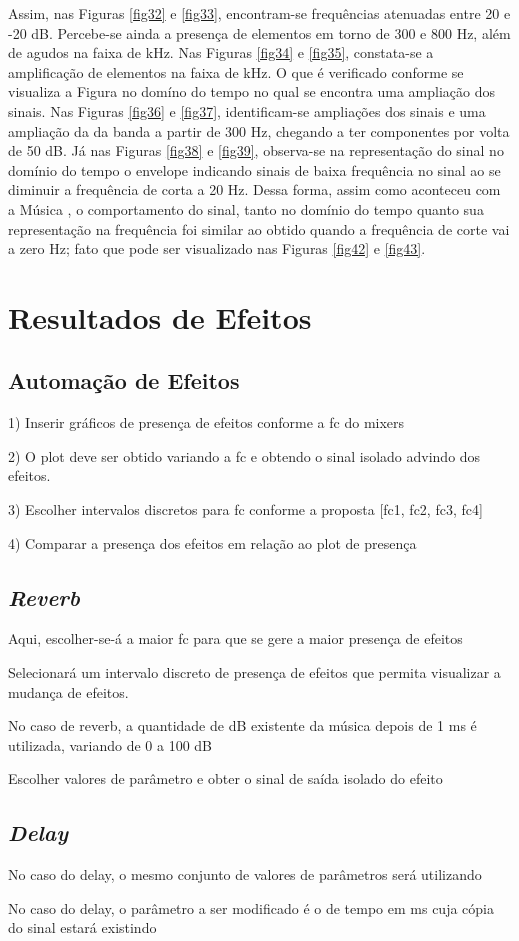 Assim, nas Figuras \ref{fig32} e \ref{fig33}, encontram-se frequências atenuadas entre 20 e -20 dB. Percebe-se ainda a presença de elementos em torno de 300 e 800 Hz, além de agudos na faixa de kHz. Nas Figuras \ref{fig34} e \ref{fig35}, constata-se a amplificação de elementos na faixa de kHz. O que é verificado conforme se visualiza a Figura no domíno do tempo no qual se encontra uma ampliação dos sinais. Nas Figuras \ref{fig36} e \ref{fig37}, identificam-se ampliações dos sinais e uma ampliação da da banda a partir de 300 Hz, chegando a ter componentes por volta de 50 dB. Já nas Figuras \ref{fig38} e \ref{fig39}, observa-se na representação do sinal no domínio do tempo o envelope indicando sinais de baixa frequência no sinal ao se diminuir a frequência de corta a 20 Hz. Dessa forma, assim como aconteceu com a Música \cite{track02}, o comportamento do sinal, tanto no domínio do tempo quanto sua representação na frequência foi similar ao obtido quando a frequência de corte vai a zero Hz; fato que pode ser visualizado nas Figuras \ref{fig42} e \ref{fig43}.

\section{Resultados de Efeitos}

\subsection{Automação de Efeitos}


1) Inserir gráficos de presença de efeitos conforme a fc do mixers

2) O plot deve ser obtido variando a fc e obtendo o sinal isolado advindo dos efeitos.

3) Escolher intervalos discretos para fc conforme a proposta [fc1, fc2, fc3, fc4]

4) Comparar a presença dos efeitos em relação ao plot de presença

\subsection{\textit{Reverb}}

Aqui, escolher-se-á a maior fc para que se gere a maior presença de efeitos

Selecionará um intervalo discreto de presença de efeitos que permita visualizar a mudança de efeitos.

No caso de reverb, a quantidade de dB existente da música depois de 1 ms é utilizada, variando de 0 a 100 dB

Escolher valores de parâmetro e obter o sinal de saída isolado do efeito

\subsection{\textit{Delay}}

No caso do delay, o mesmo conjunto de valores de parâmetros será utilizando

No caso do delay, o parâmetro a ser modificado é o de tempo em ms cuja cópia do sinal estará existindo
